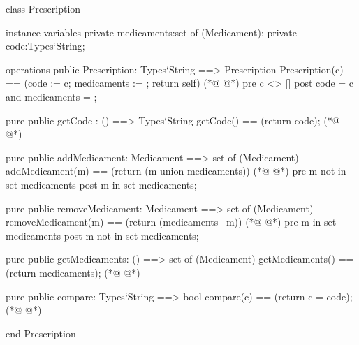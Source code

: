 \begin{vdmpp}[breaklines=true]
class Prescription

instance variables
  private medicaments:set of (Medicament);
  private code:Types`String;
  
operations
 public Prescription: Types`String ==> Prescription
  Prescription(c) == (code := c; medicaments := {}; return self)
(*@
\label{Prescription:10}
@*)
 pre c <> []
 post code = c and medicaments = {};
 
 pure public getCode : () ==> Types`String
  getCode() == (return code);
(*@
\label{getCode:15}
@*)
  
 pure public addMedicament: Medicament ==> set of (Medicament)
  addMedicament(m) == (return ({m} union medicaments))
(*@
\label{addMedicament:18}
@*)
 pre m not in set medicaments
 post m in set medicaments;
  
 pure public removeMedicament: Medicament ==> set of (Medicament)
  removeMedicament(m) == (return (medicaments \ {m}))
(*@
\label{removeMedicament:23}
@*)
 pre m in set medicaments
 post m not in set medicaments;
  
 pure public getMedicaments: () ==> set of (Medicament)
  getMedicaments() == (return medicaments);
(*@
\label{getMedicaments:28}
@*)
  
 pure public compare: Types`String ==> bool
  compare(c) == (return c = code);
(*@
\label{compare:31}
@*)

end Prescription
\end{vdmpp}
